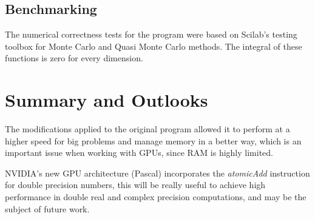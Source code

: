 \documentclass[english]{maciarticle}
\begin{document}
\subsection*{Benchmarking}

The numerical correctness tests for the program were based on Scilab's testing toolbox for Monte Carlo and Quasi Monte Carlo methods\cite{baudin}. The integral of these functions is zero for every dimension. 







\section{Summary and Outlooks}
The modifications applied to the original program allowed it to perform at a higher speed for big problems and manage memory in a better way, which is an important issue when working with GPUs, since RAM is highly limited.

NVIDIA's new GPU architecture (Pascal) incorporates the \textit{atomicAdd} instruction for double precision numbers\cite{pascal}, this will be really useful to achieve high performance in double real and complex precision computations, and may be the subject of future work. 
\end{document}
